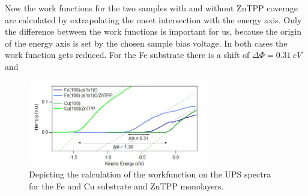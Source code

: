 Now the work functions for the two samples with and without ZnTPP coverage are calculated by extrapolating the onset intersection with the energy axis. Only the difference between the work functions is important for us, because the origin of the energy axis is set by the chosen sample bias voltage.
In both cases the work function gets reduced.
For the Fe substrate there is a shift of $\Delta\Phi = \qty{0.31}{eV}$ and 
\begin{figure}[h]
    \centering
    \includegraphics[width = 0.7\textwidth]{Plots/WF.png}
    \caption{Depicting the calculation of the workfunction on the UPS spectra for the Fe and Cu substrate and ZnTPP monolayers.}
    \label{fig:wf}
\end{figure}
\FloatBarrier
